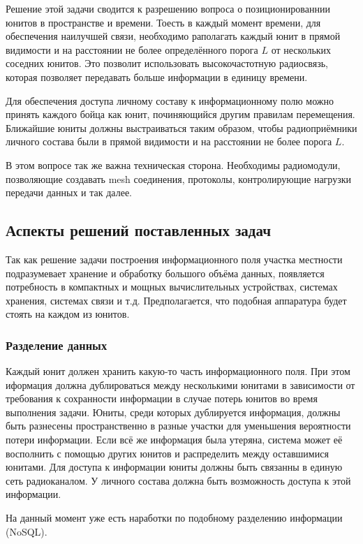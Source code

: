 Решение этой задачи сводится к разрешению вопроса о позиционированнии юнитов
в пространстве и времени. Тоесть в каждый момент времени, для обеспечения 
наилучшей связи, необходимо раполагать каждый юнит в прямой видимости и 
на расстоянии не более определённого порога $L$ от нескольких соседних юнитов.
Это позволит использовать высокочастотную радиосвязь, которая позволяет
передавать больше информации в единицу времени.

Для обеспечения доступа личному составу к информационному полю можно принять
каждого бойца как юнит, починяющийся другим правилам перемещения. Ближайшие
юниты должны выстраиваться таким образом, чтобы радиоприёмники личного состава
были в прямой видимости и на расстоянии не более порога $L$.

В этом вопросе так же важна техническая сторона. Необходимы радиомодули,
позволяющие создавать mesh соединения, протоколы, контролирующие нагрузки
передачи данных и так далее.

\subsection{Аспекты решений поставленных задач} 

Так как решение задачи построения информационного поля
участка местности подразумевает хранение и обработку большого объёма
данных, появляется потребность в компактных и мощных вычислительных
устройствах, системах хранения, системах связи и т.д. 
Предполагается, что подобная аппаратура будет
стоять на каждом из юнитов.

\subsubsection{Разделение данных}

Каждый юнит должен хранить какую-то часть информационного поля.
При этом иформация должна дублироваться между несколькими юнитами в
зависимости от требования к сохранности информации в случае потерь
юнитов во время выполнения задачи. Юниты, среди которых дублируется
информация, должны быть разнесены пространственно в разные участки
для уменьшения вероятности потери информации. Если всё же информация
была утеряна, система может её восполнить с помощью других юнитов и 
распределить между оставшимися юнитами. Для доступа к информации юниты
должны быть связанны в единую сеть радиоканалом. У личного состава
должна быть возможность доступа к этой информации. 

На данный момент уже есть наработки по подобному разделению информации (NoSQL).

